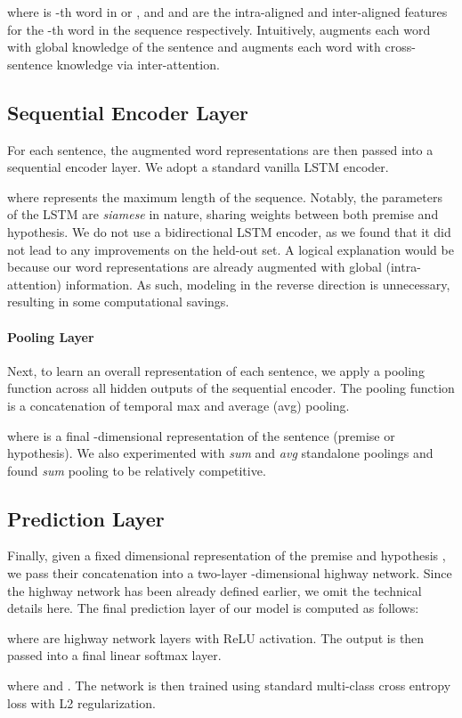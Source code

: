 \documentclass[11pt,a4paper]{article}
\begin{document}
where  is -th word in  or , and  and   are the intra-aligned   and inter-aligned  features for the -th word in the sequence respectively.
Intuitively,  augments each word with global knowledge of the sentence and  augments each word with cross-sentence knowledge via inter-attention.
\subsection{Sequential Encoder Layer}
For each sentence, the augmented word representations  are then passed into a sequential encoder layer. We adopt a standard vanilla LSTM encoder.

where  represents the maximum length of the sequence. Notably, the parameters of the LSTM are \textit{siamese} in nature, sharing weights between both premise and hypothesis. We do not use a bidirectional LSTM encoder, as we found that it did not lead to any improvements on the held-out set. A logical explanation would be because our word representations are already augmented with global (intra-attention) information. As such, modeling in the reverse direction is unnecessary, resulting in some computational savings.
\paragraph{Pooling Layer}
Next, to learn an overall representation of each sentence, we apply a pooling function across all hidden outputs of the sequential encoder. The pooling function is a concatenation of temporal max and average (avg) pooling.

where  is a final -dimensional representation of the sentence (premise or hypothesis). We also experimented with \textit{sum} and \textit{avg} standalone poolings and found \textit{sum} pooling to be relatively competitive.
\subsection{Prediction Layer}
Finally, given a fixed dimensional representation of the premise  and hypothesis , we pass their concatenation into a two-layer -dimensional highway network. Since the highway network has been already defined earlier, we omit the technical details here. The final prediction layer of our model is computed as follows:

where  are highway network layers with ReLU activation. The output is then passed into a final linear softmax layer.

where  and . The network is then trained using standard multi-class cross entropy loss with L2 regularization.
\end{document}
